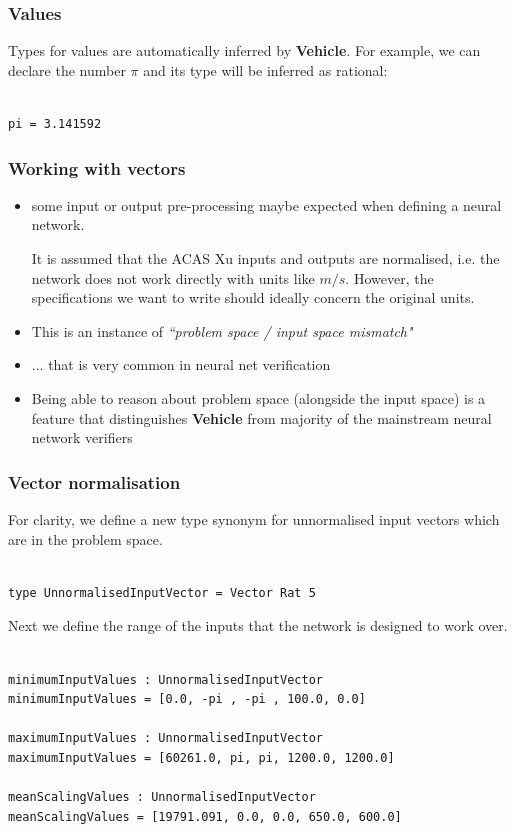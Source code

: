 \documentclass[aspectratio=169]{beamer}
\begin{document}
\begin{frame}[fragile]
\frametitle{Values}

Types for values are automatically inferred by \textbf{Vehicle}. For example, we can declare the number $\pi$ and its type will be inferred as rational:

\begin{verbatim}

pi = 3.141592
\end{verbatim}
\end{frame}

\begin{frame}[fragile]
\frametitle{Working with vectors}
\begin{itemize}
\item some input or output pre-processing maybe expected when defining a neural network.

\begin{example}
It is assumed that the ACAS Xu inputs and outputs are normalised, i.e. the network does not work directly with units like $m/s$. However, the specifications  we want to write should ideally concern the original units.
\end{example}

\pause


\item This is an instance of \emph{``problem space / input space mismatch"}

\item ... that is very common in neural net verification

\item
Being able to reason about problem space (alongside the input space) is a feature that distinguishes \textbf{Vehicle} from
majority of the mainstream neural network verifiers
\end{itemize}
\end{frame}

\begin{frame}[fragile]
\frametitle{Vector normalisation}
For clarity, we define a new type synonym for unnormalised input vectors which are in the problem space.
\begin{verbatim}

type UnnormalisedInputVector = Vector Rat 5

\end{verbatim}

Next we define the range of the inputs that the network is designed
to work over.

\begin{verbatim}

minimumInputValues : UnnormalisedInputVector
minimumInputValues = [0.0, -pi , -pi , 100.0, 0.0]

maximumInputValues : UnnormalisedInputVector
maximumInputValues = [60261.0, pi, pi, 1200.0, 1200.0]

meanScalingValues : UnnormalisedInputVector
meanScalingValues = [19791.091, 0.0, 0.0, 650.0, 600.0]
\end{verbatim}
\end{frame}
\end{document}
